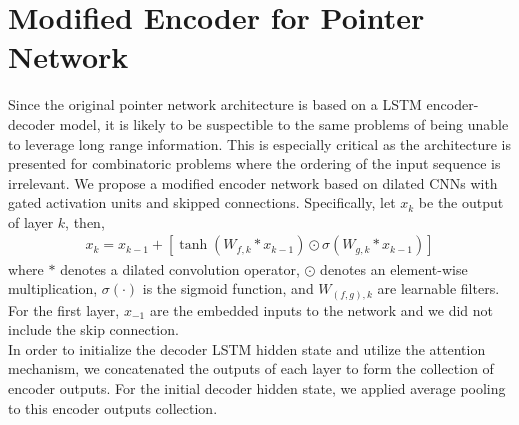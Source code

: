 \documentclass{article}
\begin{document}
\section{Modified Encoder for Pointer Network}
Since the original pointer network architecture is based on a LSTM encoder-decoder model, it is likely to be suspectible to the same problems of being unable to leverage long range information. This is especially critical as the architecture is presented for combinatoric problems where the ordering of the input sequence is irrelevant. We propose a modified encoder network based on dilated CNNs with gated activation units and skipped connections. Specifically, let $x_k$ be the output of layer $k$, then,
\begin{align}
x_{k} = x_{k-1} + [\tanh(W_{f,k}* x_{k-1})\odot\sigma(W_{g,k}* x_{k-1})]
\end{align}
where $*$ denotes a dilated convolution operator, $\odot$ denotes an element-wise multiplication, $\sigma(\cdot)$ is the sigmoid function, and $W_{(f,g),k}$ are learnable filters. For the first layer, $x_{-1}$ are the embedded inputs to the network and we did not include the skip connection. \\

In order to initialize the decoder LSTM hidden state and utilize the attention mechanism, we concatenated the outputs of each layer to form the collection of encoder outputs. For the initial decoder hidden state, we applied average pooling to this encoder outputs collection. 
\end{document}
